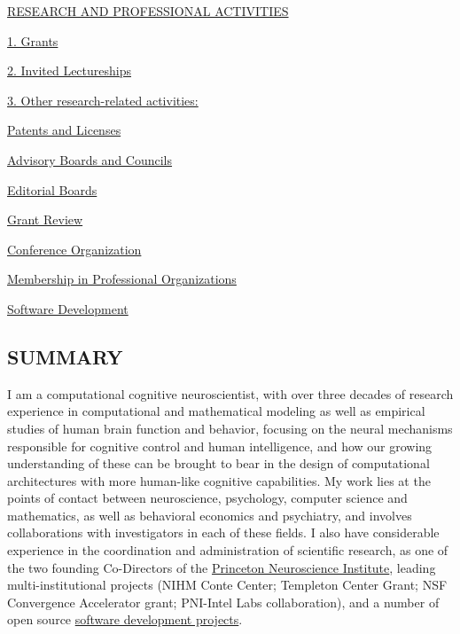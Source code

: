 \documentclass[10 pt]{article}
\begin{document}
\hyperref[secRAPA]{RESEARCH AND PROFESSIONAL ACTIVITIES}

\hyperref[secRAPA1]{\hspace{0.4in} 1. Grants}

\hyperref[secRAPA2]{\hspace{0.4in} 2. Invited Lectureships}

\hyperref[secRAPA3]{\hspace{0.4in} 3. Other research-related activities:}

\hyperref[secPaL]{\hspace{1in} Patents and Licenses}

\hyperref[secABaC]{\hspace{1in} Advisory Boards and Councils}

\hyperref[secEB]{\hspace{1in} Editorial Boards}

\hyperref[secGR]{\hspace{1in} Grant Review}

\hyperref[secCO]{\hspace{1in} Conference Organization}

\hyperref[secMiPO]{\hspace{1in} Membership in Professional Organizations}

\hyperref[secSD]{\hspace{1in} Software Development}

    \newpage


    \begin{center}
\section*{SUMMARY} \label{secSUMMARY}
    \end{center}

I am a computational cognitive neuroscientist, with over three decades of research experience in computational and mathematical modeling as well as empirical studies of human brain function and behavior, focusing on the neural mechanisms responsible for cognitive control and human intelligence, and how our growing understanding of these can be brought to bear in the design of computational architectures with more human-like cognitive capabilities. My work lies at the points of contact between neuroscience, psychology, computer science and mathematics, as well as behavioral economics and psychiatry, and involves collaborations with investigators in each of these fields. I also have considerable experience in the coordination and administration of scientific research, as one of the two founding Co-Directors of the \href{https://pni.princeton.edu}{Princeton Neuroscience Institute}, leading multi-institutional projects (NIHM Conte Center; Templeton Center Grant; NSF Convergence Accelerator grant; PNI-Intel Labs collaboration), and a number of open source \hyperref[secSD]{software development projects}.
\end{document}
